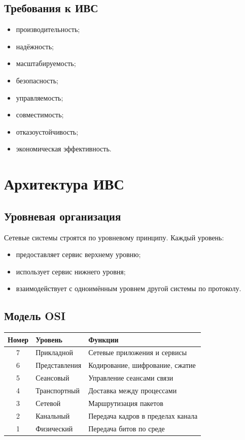 \documentclass[12pt,a4paper]{article}
\begin{document}
\subsection{Требования к ИВС}

\begin{itemize}
    \item производительность;
    \item надёжность;
    \item масштабируемость;
    \item безопасность;
    \item управляемость;
    \item совместимость;
    \item отказоустойчивость;
    \item экономическая эффективность.
\end{itemize}

\section{Архитектура ИВС}

\subsection{Уровневая организация}

Сетевые системы строятся по уровневому принципу. Каждый уровень:
\begin{itemize}
    \item предоставляет сервис верхнему уровню;
    \item использует сервис нижнего уровня;
    \item взаимодействует с одноимённым уровнем другой системы по протоколу.
\end{itemize}

\subsection{Модель OSI}

\begin{center}
\begin{tabular}{cll}
\toprule
Номер & Уровень & Функции \\
\midrule
7 & Прикладной & Сетевые приложения и сервисы \\
6 & Представления & Кодирование, шифрование, сжатие \\
5 & Сеансовый & Управление сеансами связи \\
4 & Транспортный & Доставка между процессами \\
3 & Сетевой & Маршрутизация пакетов \\
2 & Канальный & Передача кадров в пределах канала \\
1 & Физический & Передача битов по среде \\
\bottomrule
\end{tabular}
\end{center}
\end{document}
